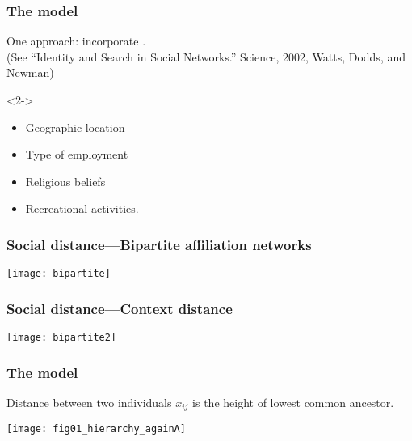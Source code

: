 \begin{frame}
  \frametitle{The model}

  One approach: incorporate .\\
  \small{(See ``Identity and Search in Social Networks.'' Science, 2002,  Watts, Dodds, and Newman\cite{watts2002b})}

  \bigskip

  \begin{block}<2->{}
    \begin{itemize}
    \item<2-> 
      Geographic location
    \item<2-> 
      Type of employment
    \item<2-> 
      Religious beliefs
    \item<2-> 
      Recreational activities.
    \end{itemize}
  \end{block}

  \bigskip


  \bigskip


\end{frame}

\begin{frame}
  \frametitle{Social distance---Bipartite affiliation networks}

  \centering
  \texttt{[image: bipartite]}


\end{frame}



\begin{frame}
  \frametitle{Social distance---Context distance}

  \centering
  \texttt{[image: bipartite2]}

\end{frame}

\begin{frame}
  \frametitle{The model}

  Distance between two individuals $x_{ij}$ 
  is the height of lowest common ancestor.

  \begin{center}
    \texttt{[image: fig01\_hierarchy\_againA]}
  \end{center}


\end{frame}

